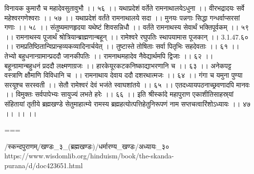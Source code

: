 विनायक कुमारौ च महादेवसुतावुभौ ।। ५६ ।।
यथाप्रदेशं वर्तेते रामनाथालयेऽधुना ।।
वीरभद्रादयः सर्वे महेश्वरगणेश्वराः ।। ५७ ।।
यथाप्रदेशं वर्तंते रामनाथालये सदा ।।
मुनयः पन्नगाः सिद्धा गन्धर्वाप्सरसां गणाः ।। ५८ ।।
संतुष्यमाणहृदया यथेष्टं शिवसन्निधौ ।।
वर्तंते रामनाथस्य सेवार्थं भक्तिपूर्वकम् ।। ५९ ।।
रामनाथस्य पूजार्थं श्रोत्रियान्ब्राह्मणान्बहून् ।।
रामेश्वरे रघुपतिः स्थापयामास पूजकान् ।। 3.1.47.६० ।।
रामप्रतिष्ठितान्विप्रान्हव्यकव्यादिनार्चयेत् ।।
तुष्टास्ते तोषिताः सर्वा पितृभिः सहदेवताः ।। ६१ ।।
तेभ्यो बहुधनान्ग्रामान्प्रददौ जानकीपतिः ।।
रामनाथमहादेव नैवेद्यार्थमपि द्विजाः ।। ६२ ।।
बहून्ग्रामान्बहुधनं प्रददौ लक्ष्मणाग्रजः ।।
हारकेयूरकटकनिष्काद्याभरणानि च ।। ६३ ।।
अनेकपट्ट वस्त्राणि क्षौमाणि विविधानि च ।।
रामनाथाय देवाय ददौ दशरथात्मजः ।। ६४ ।।
गंगा च यमुना पुण्या सरयूश्च सरस्वती ।।
सेतौ रामेश्वरं देवं भजंते स्वाघशांतये ।। ६५ ।।
एतदध्यायपठनाच्छ्रवणादपि मानवः ।।
विमुक्तः सर्वपापेभ्यः सायुज्यं लभते हरेः ।। ६६ ।।
इति श्रीस्कांदे महापुराण एकाशीतिसाहस्र्यां संहितायां तृतीये ब्रह्मखण्डे सेतुमाहात्म्ये रामस्य ब्रह्महत्योत्पत्तिहेतुनिरूपणं नाम सप्तचत्वारिंशोऽध्यायः ।। ४७ ।। ।। ।।

===

/स्कन्दपुराणम्/खण्डः_३_(ब्रह्मखण्डः)/धर्मारण्य_खण्डः/अध्यायः_३०
https://www.wisdomlib.org/hinduism/book/the-skanda-purana/d/doc423651.html

